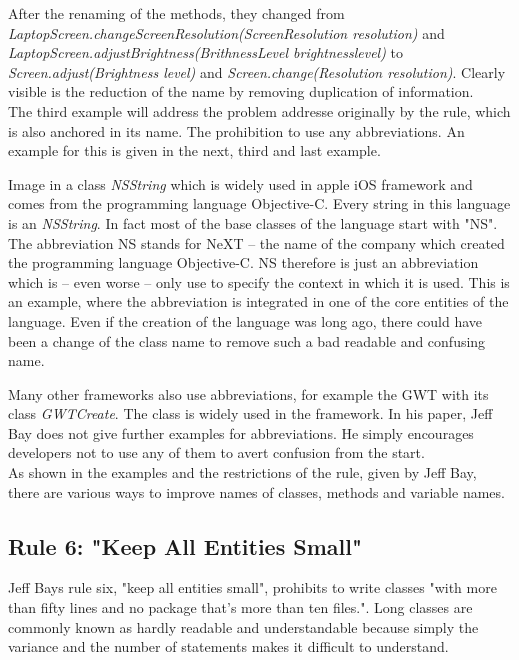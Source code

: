 After the renaming of the methods, they changed from \\ \textit{LaptopScreen.changeScreenResolution(ScreenResolution resolution)}  and \\\textit{LaptopScreen.adjustBrightness(BrithnessLevel brightnesslevel)} to \textit{Screen.adjust(Brightness level)} and \textit{Screen.change(Resolution resolution)}. Clearly visible is the reduction of the name by removing duplication of information. 
\\

The third example will address the problem addresse originally by the rule, which is also anchored in its name. The prohibition to use any abbreviations. An example for this is given in the next, third and last example. 

Image in a class \textit{NSString} which is widely used in apple iOS framework and comes from the programming language Objective-C. Every string in this language is an \textit{NSString}. In fact most of the base classes of the language start with "NS". The abbreviation NS stands for NeXT -- the name of the company which created the programming language Objective-C. NS therefore is just an abbreviation which is -- even worse -- only use to specify the context in which it is used. This is an example, where the abbreviation is integrated in one of the core entities of the language. Even if the creation of the language was long ago, there could have been a change of the class name to remove such a bad readable and confusing name.

Many other frameworks also use abbreviations, for example the \ac{GWT} with its class \textit{GWTCreate}. The class is widely used in the framework. In his paper, Jeff Bay does not give further examples for abbreviations. He simply encourages developers not to use any of them to avert confusion from the start.
\\

As shown in the examples and the restrictions of the rule, given by Jeff Bay, there are various ways to improve names of classes, methods and variable names. 

\subsection*{Rule 6: "Keep All Entities Small"}
Jeff Bays rule six, "keep all entities small", prohibits to write classes "with more than fifty lines and no package that's more than ten files.". Long classes are commonly known as hardly readable and understandable because simply the variance and the number of statements makes it difficult to understand. 
\\

